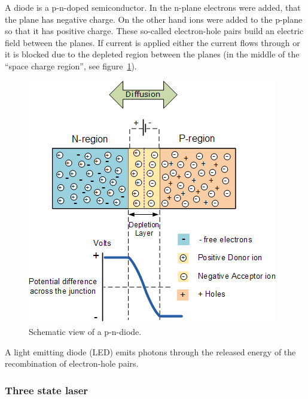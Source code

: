 A diode is a p-n-doped semiconductor.
In the n-plane electrons were added, that the plane has negative charge.
On the other hand ions were added to the p-plane so that it has positive charge.
These so-called electron-hole pairs build an electric field between the planes.
If current is applied either the current flows through or it is blocked due to the depleted region
between the planes (in the middle of the \enquote{space charge region},
see figure~\ref{fig:depletion_region}).
\begin{figure}[ht]
  \centering
  \includegraphics[width=0.8\linewidth]{content/pictures/diode.png}
  \caption{Schematic view of a p-n-diode\cite{diode}.}%
  \label{fig:depletion_region}
\end{figure}

A light emitting diode (LED) emits photons through the released energy
of the recombination of electron-hole pairs.


\subsubsection{Three state laser}\label{three-state-laser}

